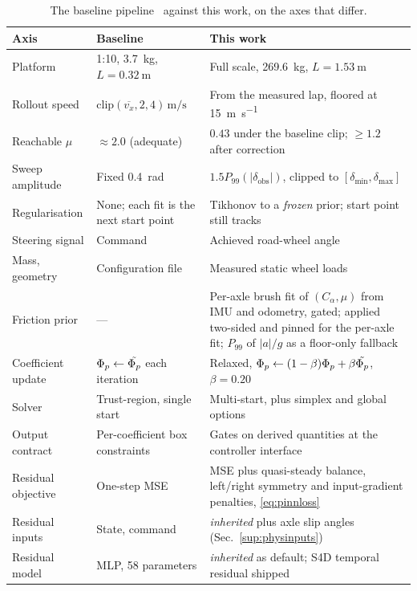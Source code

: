 \begin{table}[t]
\caption{The baseline pipeline~\cite{ontrack2025} against this work, on the
axes that differ.}
\label{sup:tabbaseline}
\centering
\begin{threeparttable}
\scriptsize
\setlength{\tabcolsep}{3pt}
\begin{tabular}{@{}p{1.95cm}p{2.55cm}p{3.0cm}@{}}
\toprule
Axis & Baseline~\cite{ontrack2025} & This work\\
\midrule
Platform & 1:10, \SI{3.7}{\kilo\gram}, $L=\SI{0.32}{\meter}$ &
Full scale, \SI{269.6}{\kilo\gram}, $L=\SI{1.53}{\meter}$\\
Rollout speed & $\mathrm{clip}(\overline{v_{x}},2,4)\,\si{\meter\per\second}$ &
From the measured lap, floored at \SI{15}{\meter\per\second}\\
Reachable $\mu$ & $\approx2.0$ (adequate) & $0.43$ under the baseline clip;
$\ge1.2$ after correction\\
Sweep amplitude & Fixed \SI{0.4}{\radian} &
$1.5P_{99}(|\delta_{\mathrm{obs}}|)$, clipped to
$[\delta_{\min},\delta_{\max}]$\\
Regularisation & None; each fit is the next start point &
Tikhonov to a \emph{frozen} prior; start point still tracks\\
Steering signal & Command & Achieved road-wheel angle\\
Mass, geometry & Configuration file & Measured static wheel loads\\
Friction prior & --- & Per-axle brush fit of $(C_{\alpha},\mu)$ from IMU and
odometry, gated; applied two-sided and pinned for the per-axle fit; $P_{99}$ of
$|a|/g$ as a floor-only fallback\\
Coefficient update & $\Phi_{p}\leftarrow\tilde{\Phi_{p}}$ each iteration & Relaxed,
$\Phi_{p}\leftarrow(1-\beta)\Phi_{p}+\beta\tilde{\Phi_{p}}$, $\beta=\num{0.20}$\\
Solver & Trust-region, single start & Multi-start, plus simplex and global
options\\
Output contract & Per-coefficient box constraints & Gates on derived
quantities at the controller interface\\
Residual objective & One-step MSE & MSE plus quasi-steady balance, left/right
symmetry and input-gradient penalties, \eqref{eq:pinnloss}\\
Residual inputs & State, command & \emph{inherited} plus axle slip angles
(Sec.~\ref{sup:physinputs})\\
Residual model & MLP, 58 parameters & \emph{inherited} as default; S4D
temporal residual shipped\\

\end{tabular}
\end{threeparttable}
\end{table}
